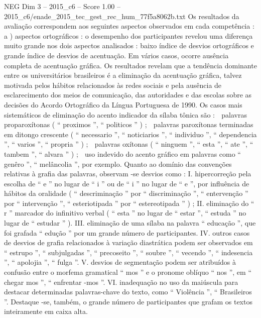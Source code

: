 \begin{textsample}{NEG Dim 3 – 2015\_c6 – Score 1.00 – 2015\_c6/enade\_2015\_tec\_gest\_rec\_hum\_77f5a8062b.txt}
Os resultados da avaliação correspondem aos seguintes aspectos observados em cada competência : a ) aspectos ortográficos : o desempenho dos participantes revelou uma diferença muito grande nos dois aspectos analisados : baixo índice de desvios ortográficos e grande índice de desvios de acentuação.
Em vários casos, ocorre ausência completa de acentuação gráfica.
Os resultados revelam que a tendência dominante entre os universitários brasileiros é a eliminação da acentuação gráfica, talvez motivada pelos hábitos relacionados às redes sociais e pela ausência de esclarecimento dos meios de comunicação, das autoridades e das escolas sobre as decisões do Acordo Ortográfico da Língua Portuguesa de 1990.
Os casos mais sistemáticos de eliminação do acento indicador da sílaba tônica são :  palavras proparoxítonas ( “ proximos ”, “ politicos ” ) ;  palavras paroxítonas terminadas em ditongo crescente ( “ necessario ”, “ noticiarios ”, “ individuo ”, “ dependencia ”, “ varios ”, “ propria ” ) ;  palavras oxítonas ( “ ninguem ”, “ esta ”, “ ate ”, “ tambem ”, “ alvara ” ) ;  uso indevido do acento gráfico em palavras como “ genêro ”, “ melâncolia ”, por exemplo.
Quanto ao domínio das convenções relativas à grafia das palavras, observam -se desvios como : I. hipercorreção pela escolha de “ e ” no lugar de “ i ” ou de “ i ” no lugar de “ e ”, por influência de hábitos da oralidade ( “ descriminação ” por “ discriminação ”, “ entervenção ” por “ intervenção ”, “ esteriotipada ” por “ estereotipada ” ) ; II. eliminação do “ r ” marcador do infinitivo verbal ( “ esta ” no lugar de “ estar ”, “ estuda ” no lugar de “ estudar ” ).
III. eliminação de uma sílaba na palavra “ educação ”, que foi grafada “ edução ” por um grande número de participantes.
IV. outros casos de desvios de grafia relacionados à variação diastrática podem ser observados em “ estrupo ”, “ subjulgadas ”, “ precoseito ”, “ soubre ”, “ vecendo ”, “ indesencia ”, “ apolojia ”, “ fulga ”.
V. desvios de segmentação podem ser atribuídos à confusão entre o morfema gramatical “ mos ” e o pronome oblíquo “ nos ”, em “ chegar mos ”, “ enfrentar -mos ”.
VI. inadequação no uso da maiúscula para destacar determinadas palavras-chave do texto, como “ Violência ”, “ Brasileiros ”.
Destaque -se, também, o grande número de participantes que grafam os textos inteiramente em caixa alta.

\end{textsample}

